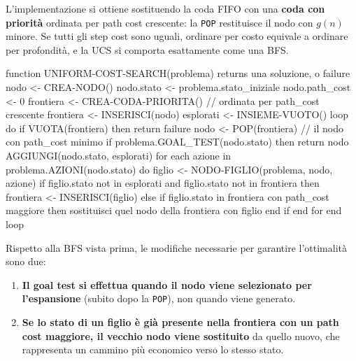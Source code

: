 \documentclass[a4paper, 11pt, oneside]{book}
\theoremstyle{definition}
\begin{document}
	L'implementazione si ottiene sostituendo la coda FIFO con una \textbf{coda con priorit\`a}
	ordinata per path cost crescente: la \texttt{POP} restituisce il nodo con $g(n)$ minore.
	Se tutti gli step cost sono uguali, ordinare per costo equivale a ordinare per
	profondit\`a, e la UCS si comporta esattamente come una BFS.

\begin{codice}
function UNIFORM-COST-SEARCH(problema) returns una soluzione, o failure
    nodo <- CREA-NODO()
    nodo.stato <- problema.stato_iniziale
    nodo.path_cost <- 0
    frontiera <- CREA-CODA-PRIORITA()  // ordinata per path_cost crescente
    frontiera <- INSERISCI(nodo)
    esplorati <- INSIEME-VUOTO()
    loop do
        if VUOTA(frontiera) then return failure
        nodo <- POP(frontiera)         // il nodo con path_cost minimo
        if problema.GOAL_TEST(nodo.stato) then return nodo
        AGGIUNGI(nodo.stato, esplorati)
        for each azione in problema.AZIONI(nodo.stato) do
            figlio <- NODO-FIGLIO(problema, nodo, azione)
            if figlio.stato not in esplorati and figlio.stato not in frontiera then
                frontiera <- INSERISCI(figlio)
            else if figlio.stato in frontiera con path_cost maggiore then
                sostituisci quel nodo della frontiera con figlio
            end if
        end for
    end loop
\end{codice}

	Rispetto alla BFS vista prima, le modifiche necessarie per garantire l'ottimalit\`a sono
	due:
	\begin{enumerate}
		\item \textbf{Il goal test si effettua quando il nodo viene selezionato per
			l'espansione} (subito dopo la \texttt{POP}), non quando viene generato.

		\item \textbf{Se lo stato di un figlio \`e gi\`a presente nella frontiera con un path
			cost maggiore, il vecchio nodo viene sostituito} da quello nuovo, che
			rappresenta un cammino pi\`u economico verso lo stesso stato.
	\end{enumerate}
\end{document}

